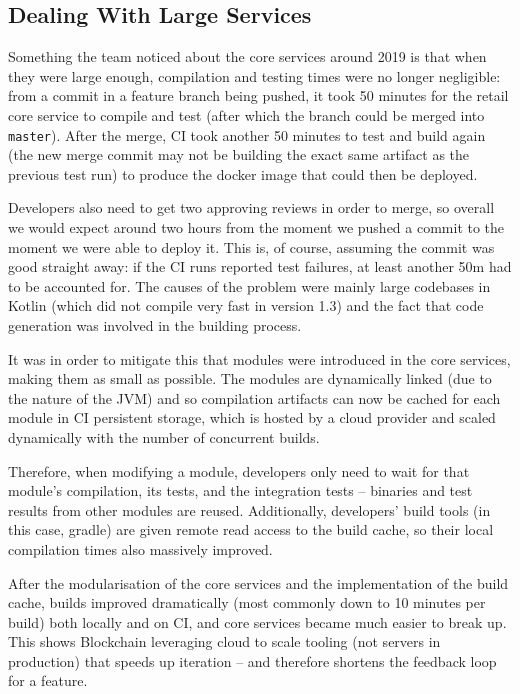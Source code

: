 \documentclass[conference]{IEEEtran}
\begin{document}
    \subsection{Dealing With Large Services}

    Something the team noticed about the core services around 2019 is that when they were large
    enough, compilation and testing times were no longer negligible: from a commit in a feature
    branch being pushed, it took 50 minutes for the retail core service to compile and test
    (after which the branch could be merged into \texttt{master}).
    After the merge, CI took another 50 minutes to test and build again (the new merge commit
    may not be building the exact same artifact as the previous test run) to produce
    the docker image that could then be deployed.

    Developers also need to get two approving reviews in order to merge, so overall we would
    expect around two hours from the moment we pushed a commit to the moment we were able to deploy it.
    This is, of course, assuming the commit was good straight away: if the CI runs reported
    test failures, at least another 50m had to be accounted for.
    The causes of the problem were mainly large codebases in Kotlin (which did not compile very fast in version 1.3)
    and the fact that code generation was involved in the building process.

    It was in order to mitigate this that modules were introduced in the core services, making them
    as small as possible.
    The modules are dynamically linked (due to the nature of the JVM) and so compilation artifacts
    can now be cached for each module in CI persistent storage, which is hosted by a cloud provider
    and scaled dynamically with the number of concurrent builds.

    Therefore, when modifying a module, developers only need to wait for that module's compilation,
    its tests, and the integration tests -- binaries and test results from other modules are reused.
    Additionally, developers' build tools (in this case, gradle) are given remote read
    access to the build cache, so their local compilation times also massively improved.

    After the modularisation of the core services and the implementation of the build cache, builds
    improved dramatically (most commonly down to 10 minutes per build) both locally and on CI, and
    core services became much easier to break up.
    This shows Blockchain leveraging cloud to scale tooling (not servers in production) that speeds
    up iteration -- and therefore shortens the feedback loop for a feature.
\end{document}
